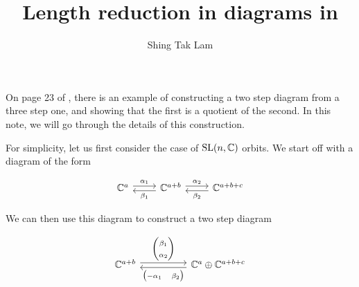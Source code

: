 \documentclass{article}
\title{Length reduction in diagrams in \citetitle{kobak_classical_1996}}
\author{Shing Tak Lam}
\begin{document}
\maketitle
On page 23 of \cite{kobak_classical_1996}, there is an example of constructing a two step diagram from a three step one, and showing that the first is a quotient of the second. In this note, we will go through the details of this construction.

For simplicity, let us first consider the case of \(\operatorname{SL}(n, \mathbb{C})\) orbits. We start off with a diagram of the form

\begin{equation}
    \label{eq:three-step}
    \begin{tikzcd}
        {\C^a} & {\C^{a+b}} & {\C^{a+b+c}}
        \arrow["{\alpha_1}", shift left=1, from=1-1, to=1-2]
        \arrow["{\alpha_2}", shift left=1, from=1-2, to=1-3]
        \arrow["{\beta_2}", shift left=1, from=1-3, to=1-2]
        \arrow["{\beta_1}", shift left=1, from=1-2, to=1-1]
    \end{tikzcd}
\end{equation}

We can then use this diagram to construct a two step diagram

\begin{equation}
    \label{eq:two-step}
    \begin{tikzcd}[ampersand replacement=\&]
        {\C^{a+b}} \&\& {\C^a \oplus \C^{a+b+c}}
        \arrow["{\begin{pmatrix}\beta_1 \\ \alpha_2\end{pmatrix}}", shift left=1, from=1-1, to=1-3]
        \arrow["{\begin{pmatrix}-\alpha_1 & \beta_2\end{pmatrix}}", shift left=1, from=1-3, to=1-1]
    \end{tikzcd}
\end{equation}
\end{document}
